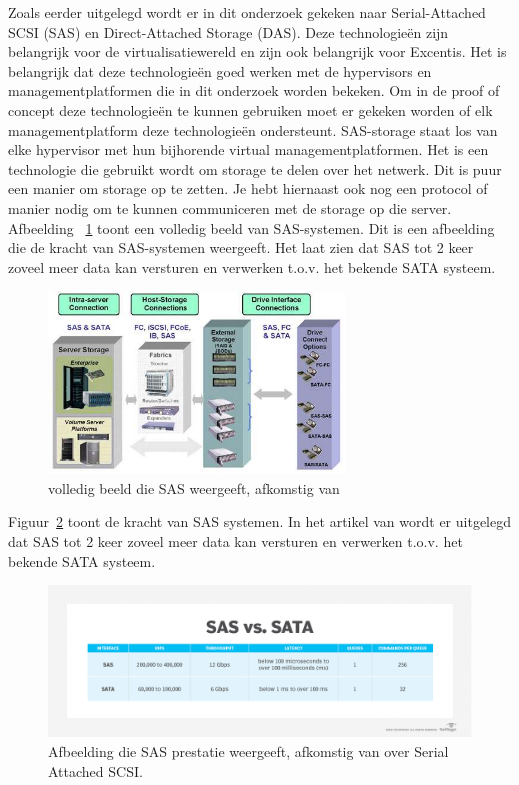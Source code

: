 Zoals eerder uitgelegd wordt er in dit onderzoek gekeken naar Serial-Attached SCSI (SAS) en Direct-Attached Storage (DAS). Deze technologieën zijn belangrijk voor de virtualisatiewereld en zijn ook belangrijk voor Excentis. Het is belangrijk dat deze technologieën goed werken met de hypervisors en managementplatformen die in dit onderzoek worden bekeken.
Om in de proof of concept deze technologieën te kunnen gebruiken moet er gekeken worden of elk managementplatform deze technologieën ondersteunt.
SAS-storage staat los van elke hypervisor met hun bijhorende virtual managementplatformen. Het is een technologie die gebruikt wordt om storage te delen over het netwerk. Dit is puur een manier om storage op te zetten. Je hebt hiernaast ook nog een protocol of manier nodig om te kunnen communiceren met de storage op die server.
Afbeelding ~\ref{fig:sas} toont een volledig beeld van SAS-systemen. Dit is een afbeelding die de kracht van SAS-systemen weergeeft. Het laat zien dat SAS tot 2 keer zoveel meer data kan versturen en verwerken t.o.v. het bekende SATA systeem.
\begin{figure}[h!]
    \centering
    \includegraphics[width=0.7\textwidth]{../onderzoek/storagesas-das.jpg} 
    \caption{volledig beeld die SAS weergeeft, afkomstig van \textcite{eetimesSAS}}
    \label{fig:sas}
\end{figure}

\FloatBarrier
Figuur~\ref{fig:saspres} toont de kracht van SAS systemen. In het artikel van \textcite{loshin2022sas} wordt er uitgelegd dat SAS tot 2 keer zoveel meer data kan versturen en verwerken t.o.v. het bekende SATA systeem.

\begin{figure}[h!]
    \centering
    \includegraphics[width=1.1\textwidth]{../onderzoek/sas_vs_sata-f.png} 
    \caption{Afbeelding die SAS prestatie weergeeft, afkomstig van \textcite{loshinKranzSAS} over Serial Attached SCSI.}
    \label{fig:saspres}
\end{figure}


